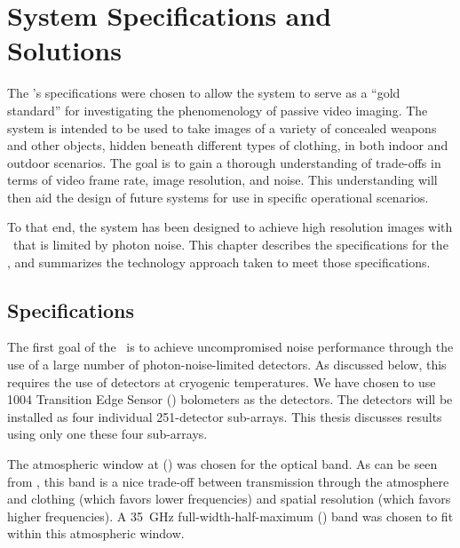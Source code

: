 \chapter{System Specifications and Solutions}\label{c:specs}

The \Imager's specifications were chosen to allow the system to serve as a ``gold standard'' for investigating the phenomenology of passive video imaging.
The system is intended to be used to take images of a variety of concealed weapons and other objects, hidden beneath different types of clothing, in both indoor and outdoor scenarios.
The goal is to gain a thorough understanding of trade-offs in terms of video frame rate, image resolution, and noise.
This understanding will then aid the design of future systems for use in specific operational scenarios.

To that end, the system has been designed to achieve high resolution images with \NETD\ that is limited by photon noise.
This chapter describes the specifications for the \Imager, and summarizes the technology approach taken to meet those specifications.

\section{Specifications} \label{sec:ch2-specifications}

The first goal of the \Imager\ is to achieve uncompromised noise performance through the use of a large number of photon-noise-limited detectors.
As discussed below, this requires the use of detectors at cryogenic temperatures.
We have chosen to use 1004 Transition Edge Sensor (\TES) bolometers as the detectors.
The detectors will be installed as four individual 251-detector sub-arrays.
This thesis discusses results using only one these four sub-arrays.

The atmospheric window at  () was chosen for the optical band.
As can be seen from , this band is a nice trade-off between transmission through the atmosphere and clothing (which favors lower frequencies) and spatial resolution (which favors higher frequencies).
A \SI{35}{\GHz} full-width-half-maximum (\FWHM) band was chosen to fit within this atmospheric window.

